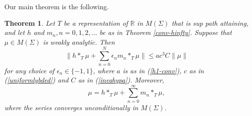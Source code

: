 \documentclass[12pt]{article}
\newcommand{\R}{\mathbb R}
\newtheorem{thm}[defin]{Theorem}
\begin{document}
Our main theorem is the following.
\begin{thm}
Let $T$ be a representation of $\R$ in $M(\Sigma)$
that is sup path attaining,
and let $h$ and $m_n, n=0,1 ,2 , \ldots$
be as in Theorem \ref{conv-hinfty}.  Suppose that
 $\mu\in M(\Sigma)$ is weakly analytic.  Then 
\begin{equation}
\|h*_T\mu + \sum_{n=0}^N\epsilon_n m_n*_T \mu\|\leq a c^3 C\|\mu\|
\label{eq-15.2.95}
\end{equation}
for any choice of $\epsilon_n\in \{-1,1\}$, 
where $a$ is as in  (\ref{h1-conv}), 
$c$ as in (\ref{uniformlybded}) and $C$ as in (\ref{ineqhypa}).
Moreover,
\begin{equation}
\mu=h*_T\mu+\sum_{n=0}^\infty m_n*_T \mu,
\label{greatdecomp}
\end{equation}
where the series converges unconditionally in 
$M(\Sigma)$.
\label{ucc-analytic}
\end{thm}
\end{document}
